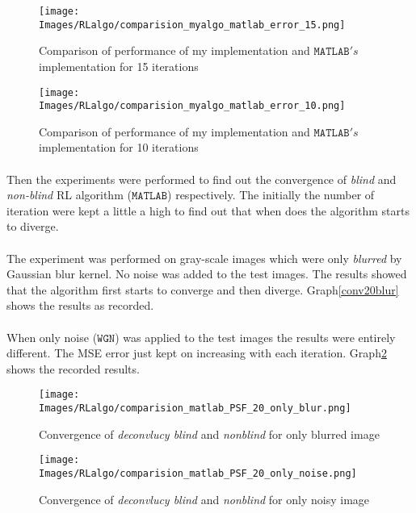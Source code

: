 \documentclass[a4paper]{book}
\begin{document}
\begin{figure}[H]
	\centering
	\begin{minipage}{0.45\textwidth}
		\centering
		\texttt{[image: Images/RLalgo/comparision\_myalgo\_matlab\_error\_15.png]}
		\caption[RL implementation comparison 15 iterations]{Comparison of performance of my implementation and $ \mathtt{MATLAB}'s $ implementation for 15 iterations}
		\label{comp15mymatlab}
	\end{minipage}\hfill
	\begin{minipage}{0.45\textwidth}
		\centering
		\texttt{[image: Images/RLalgo/comparision\_myalgo\_matlab\_error\_10.png]}
		\caption[RL implementation comparison 10 iterations]{Comparison of performance of my implementation and $ \mathtt{MATLAB}'s $ implementation for 10 iterations}
		\label{comp10mymatlab}
	\end{minipage}
\end{figure}

\paragraph*{} Then the experiments were performed to find out the convergence of \textit{blind} and \textit{non-blind} RL algorithm ($ \mathtt{MATLAB} $) respectively. The initially the number of iteration were kept a little a high to find out that when does the algorithm starts to diverge.

\paragraph*{}The experiment was performed on gray-scale images which were only \textit{blurred} by Gaussian blur kernel. No noise was added to the test images. The results showed that the algorithm first starts to converge and then diverge. Graph\ref{conv20blur} shows the results as recorded.
\paragraph*{} When only noise ($ \mathtt{WGN} $) was applied to the test images the results were entirely different. The MSE error just kept on increasing with each iteration. Graph\ref{conv20noisy} shows the recorded results.

\begin{figure}[H]
	\centering
	\begin{minipage}{0.45\textwidth}
		\centering
		\texttt{[image: Images/RLalgo/comparision\_matlab\_PSF\_20\_only\_blur.png]}
		\caption[RL convergence on blurred image ]{Convergence of \textit{deconvlucy blind} and \textit{nonblind} for only blurred image}
		\label{conv20blur}
	\end{minipage}\hfill
	\begin{minipage}{0.45\textwidth}
		\centering
		\texttt{[image: Images/RLalgo/comparision\_matlab\_PSF\_20\_only\_noise.png]}
		\caption[RL convergence on noisy image]{Convergence of \textit{deconvlucy blind} and \textit{nonblind} for only noisy image}
		\label{conv20noisy}
	\end{minipage}
\end{figure}
\end{document}
